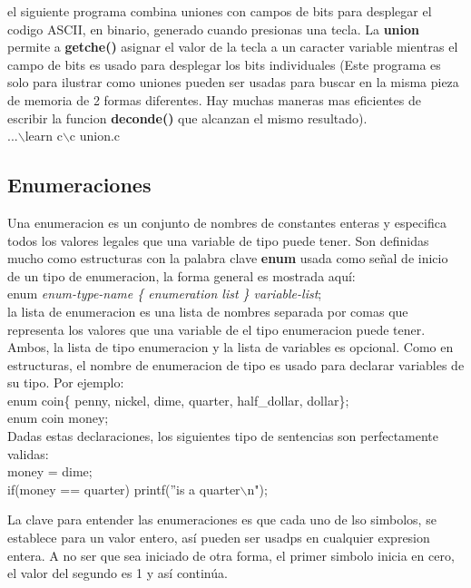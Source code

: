 \documentclass[]{article}
\begin{document}
			el siguiente programa combina uniones con campos de bits para desplegar el codigo ASCII, en binario, generado cuando presionas una tecla. La \textbf{union} permite a \textbf{getche()} asignar el valor de la tecla a un caracter variable mientras el campo de bits es usado para desplegar los bits individuales (Este programa es solo para ilustrar como uniones pueden ser usadas para  buscar en la misma pieza de memoria de 2 formas diferentes. Hay muchas maneras mas eficientes de escribir la funcion \textbf{deconde()} que alcanzan el mismo resultado).\\
			
			...$\backslash$learn c$\backslash$c union.c
			
			\subsection{Enumeraciones}
			
			Una enumeracion es un conjunto de nombres de constantes enteras y especifica todos los valores legales que una variable de tipo puede tener. Son definidas mucho como estructuras con la palabra clave \textbf{enum} usada como señal de inicio de un tipo de enumeracion, la forma general es mostrada aquí:\\
			
			enum \textit{enum-type-name \{ enumeration list \} variable-list};\\
			
			la lista de enumeracion es una lista de nombres separada por comas que representa los valores que una variable de el tipo enumeracion puede tener. Ambos, la lista de tipo enumeracion y la lista de variables es opcional. Como en estructuras, el nombre de enumeracion de tipo es usado para declarar variables de su tipo. Por ejemplo:\\
			
			enum coin\{ penny, nickel, dime, quarter, half\_dollar, dollar\};\\
			
			enum coin money;\\
			
			Dadas estas declaraciones, los siguientes tipo de sentencias son perfectamente validas:\\
			
			money = dime;\\
			
			if(money == quarter) printf(''is a quarter$\backslash$n");
			
			La clave para entender las enumeraciones es que cada uno de lso simbolos, se establece para un valor entero, así pueden ser usadps en cualquier expresion entera. A no ser que sea iniciado de otra forma, el primer simbolo inicia en cero, el valor del segundo es 1 y así continúa.\\
			
\end{document}
